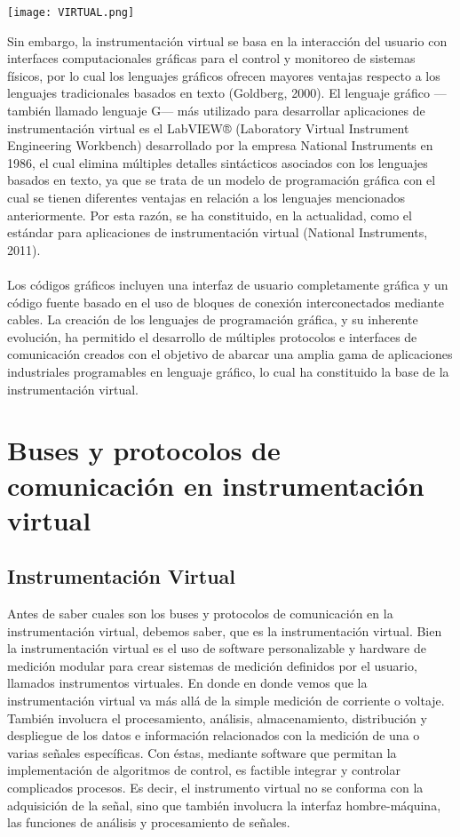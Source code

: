 \documentclass[12pt,letterpaper, onecolumn, titlepage, oneside]{book}
\begin{document}
\begin{center}
    \texttt{[image: VIRTUAL.png]}
\end{center}

Sin embargo, la instrumentación virtual se basa en la interacción del usuario con interfaces computacionales gráficas para el control y monitoreo de sistemas físicos, por lo cual los lenguajes gráficos ofrecen mayores ventajas respecto a los lenguajes tradicionales basados en texto (Goldberg, 2000). El lenguaje gráfico —también llamado lenguaje G— más utilizado para
desarrollar aplicaciones de instrumentación virtual es el LabVIEW® (Laboratory Virtual Instrument Engineering Workbench) desarrollado por la empresa National Instruments en 1986, el cual elimina múltiples detalles sintácticos asociados con los lenguajes basados en texto, ya que se trata de un modelo de programación gráfica con el cual se tienen diferentes ventajas en relación a los lenguajes mencionados anteriormente. Por esta razón, se ha constituido, en la actualidad, como el
estándar para aplicaciones de instrumentación virtual (National Instruments, 2011).
\\
\\
Los códigos gráficos incluyen una interfaz de usuario completamente gráfica y un código fuente basado en el uso de bloques de conexión interconectados mediante cables. La creación de los lenguajes de programación gráfica, y su inherente evolución, ha permitido el desarrollo de múltiples protocolos e interfaces de comunicación creados con el objetivo de abarcar una amplia gama de aplicaciones industriales programables en lenguaje gráfico, lo cual ha constituido la base
de la instrumentación virtual.

\section{Buses y protocolos de comunicación en instrumentación virtual}

\subsection{Instrumentación Virtual}

Antes de saber cuales son los buses y protocolos de comunicación en la instrumentación virtual, debemos saber, que es la instrumentación virtual. Bien la instrumentación virtual  es el uso de software personalizable y hardware de medición modular para crear sistemas de medición definidos por el usuario, llamados instrumentos virtuales. En donde en donde vemos que la instrumentación virtual va más allá de la simple medición de corriente o voltaje. También involucra el procesamiento, análisis, almacenamiento, distribución y despliegue de los datos e información relacionados con la medición de una o varias señales específicas. Con éstas, mediante software que permitan la implementación de algoritmos de control, es factible integrar y controlar complicados procesos. Es decir, el instrumento virtual no se conforma con la adquisición de la señal, sino que también involucra la interfaz hombre-máquina, las funciones de análisis y procesamiento de señales.
\end{document}
